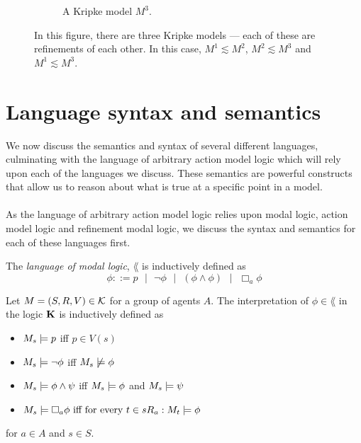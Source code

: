 \begin{figure}[ht!]
\begin{subfigure}[b]{.30\textwidth}
\caption{A Kripke model $M^3$.}
\label{refinementThree}
\end{subfigure}
\caption[Examples of refinements]{In this figure, there are three Kripke models --- each of these
are refinements of each other.
In this case, $M^1 \lesssim M^2$, $M^2 \lesssim M^3$ and $M^1 \lesssim M^3$.}
\label{figure:refinementExamples}
\end{figure}

\section{Language syntax and semantics} \label{subsec:prelim:semantics}

We now discuss the semantics and syntax of several different languages, culminating with the language of
arbitrary action model logic which will rely upon each of the languages we discuss.
These semantics are powerful constructs that allow us to reason about what is true at a specific
point in a model.\\
\\
As the language of arbitrary action model logic relies upon modal logic, action model logic and
refinement modal logic, we discuss the syntax and semantics for each of these languages first.

\begin{defn} \label{modalLogic:syntax}
The {\em language of modal logic}, $\lang$ is inductively defined as
\[
	\phi ::= p \text{ } | \text{ } \neg \phi \text{ } | \text{ } (\phi \land \phi) \text{ } | \text{ } \Box_a \phi
\]
\end{defn}

\begin{defn} \label{modalLogic:semantics}
Let $M = (S, R, V) \in \mathcal{K}$ for a group of agents $A$.
The interpretation of $\phi \in \lang$ in the logic $\bf K$ is inductively defined as

\begin{itemize}
	\item $M_s \models p$ iff $p \in V(s)$
	\item $M_s \models \neg \phi$ iff $M_s \not \models \phi$
	\item $M_s \models \phi \land \psi$ iff $M_s \models \phi$ and $M_s \models \psi$
	\item $M_s \models \Box_a \phi \text{ iff for every }t \in s R_a: M_t \models \phi$
\end{itemize}

for $a \in A$ and $s \in S$.
\end{defn}

